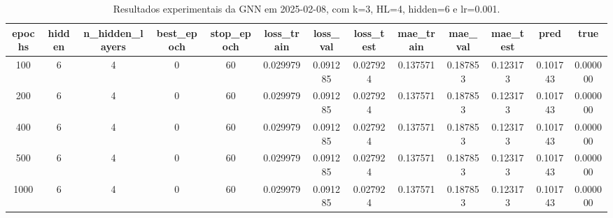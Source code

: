 \begin{table}[h]
\centering
\caption{Resultados experimentais da GNN em 2025-02-08, com k=3, HL=4, hidden=6 e lr=0.001.}
\label{tab:gnn_results_k3_hl4_h6_d20250208}
\begin{tabular}{ccccccccccccc}
\toprule
epochs & hidden & n\_hidden\_layers & best\_epoch & stop\_epoch & loss\_train & loss\_val & loss\_test & mae\_train & mae\_val & mae\_test & pred & true \\
\midrule
100 & 6 & 4 & 0 & 60 & 0.029979 & 0.091285 & 0.027924 & 0.137571 & 0.187853 & 0.123173 & 0.101743 & 0.000000 \\
200 & 6 & 4 & 0 & 60 & 0.029979 & 0.091285 & 0.027924 & 0.137571 & 0.187853 & 0.123173 & 0.101743 & 0.000000 \\
400 & 6 & 4 & 0 & 60 & 0.029979 & 0.091285 & 0.027924 & 0.137571 & 0.187853 & 0.123173 & 0.101743 & 0.000000 \\
500 & 6 & 4 & 0 & 60 & 0.029979 & 0.091285 & 0.027924 & 0.137571 & 0.187853 & 0.123173 & 0.101743 & 0.000000 \\
1000 & 6 & 4 & 0 & 60 & 0.029979 & 0.091285 & 0.027924 & 0.137571 & 0.187853 & 0.123173 & 0.101743 & 0.000000 \\
\bottomrule
\end{tabular}
\end{table}
